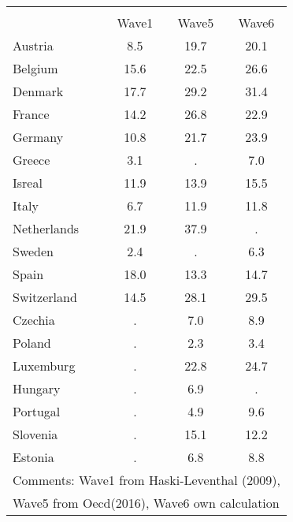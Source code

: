{
\def\sym#1{\ifmmode^{#1}\else\(^{#1}\)\fi}
\begin{tabular}{l*{1}{ccc}}
\hline\hline
                    &\multicolumn{3}{c}{}                  \\
                    &       Wave1&       Wave5&       Wave6\\
\hline
Austria             &         8.5&        19.7&        20.1\\
Belgium             &        15.6&        22.5&        26.6\\
Denmark             &        17.7&        29.2&        31.4\\
France              &        14.2&        26.8&        22.9\\
Germany             &        10.8&        21.7&        23.9\\
Greece              &         3.1&           .&         7.0\\
Isreal              &        11.9&        13.9&        15.5\\
Italy               &         6.7&        11.9&        11.8\\
Netherlands         &        21.9&        37.9&           .\\
Sweden              &         2.4&           .&         6.3\\
Spain               &        18.0&        13.3&        14.7\\
Switzerland         &        14.5&        28.1&        29.5\\
Czechia             &           .&         7.0&         8.9\\
Poland              &           .&         2.3&         3.4\\
Luxemburg           &           .&        22.8&        24.7\\
Hungary             &           .&         6.9&           .\\
Portugal            &           .&         4.9&         9.6\\
Slovenia            &           .&        15.1&        12.2\\
Estonia             &           .&         6.8&         8.8\\
\hline\hline
\multicolumn{4}{l}{\footnotesize Comments: Wave1 from Haski-Leventhal (2009),}\\
\multicolumn{4}{l}{\footnotesize Wave5 from Oecd(2016), Wave6 own calculation}\\
\end{tabular}
}
